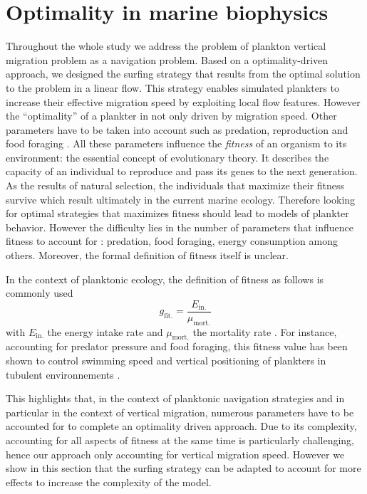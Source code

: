 \section{Optimality in marine biophysics}\label{sec:optimality}

Throughout the whole study we address the problem of plankton vertical migration problem as a navigation problem.
Based on a optimality-driven approach, we designed the surfing strategy that results from the optimal solution to the problem in a linear flow.
This strategy enables simulated plankters to increase their effective migration speed by exploiting local flow features.
However the ``optimality'' of a plankter in not only driven by migration speed.
Other parameters have to be taken into account such as predation, reproduction and food foraging \citep{smith2011optimality}.
All these parameters influence the \textit{fitness} of an organism to its environment: the essential concept of evolutionary theory.
It describes the capacity of an individual to reproduce and pass its genes to the next generation.
As the results of natural selection, the individuals that maximize their fitness survive which result ultimately in the current marine ecology.
Therefore looking for optimal strategies that maximizes fitness should lead to models of plankter behavior.
However the difficulty lies in the number of parameters that influence fitness to account for \citep{smith2011optimality}: predation, food foraging, energy consumption among others.
Moreover, the formal definition of fitness itself is unclear.

In the context of planktonic ecology, the definition of fitness as follows is commonly used
\begin{equation}\label{eq:fitness}
	g_{\mathrm{fit.}} = \frac{E_{\mathrm{in.}}}{\mu_{\mathrm{mort.}}}
\end{equation}
with $E_{\mathrm{in.}}$ the energy intake rate and $\mu_{\mathrm{mort.}}$ the mortality rate \citep{visser2007motility}.
For instance, accounting for predator pressure and food foraging, this fitness value has been shown to control swimming speed and vertical positioning of plankters in tubulent environnements \citep{visser2009swimming}.

This highlights that, in the context of planktonic navigation strategies and in particular in the context of vertical migration, numerous parameters have to be accounted for to complete an optimality driven approach.
Due to its complexity, accounting for all aspects of fitness at the same time is particularly challenging, hence our approach only accounting for vertical migration speed.
However we show in this section that the surfing strategy can be adapted to account for more effects to increase the complexity of the model.

